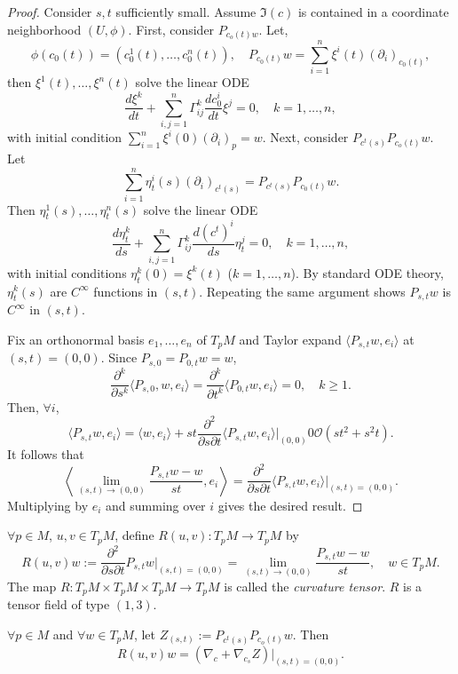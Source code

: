 \begin{proof}
Consider $s,t$ sufficiently small. Assume $\Im(c)$ is contained in a coordinate neighborhood $(U,\phi)$.
First, consider $P_{c_o(t)w}$. Let, 
\[
\phi(c_0(t)) = (c_0^1(t), \dots, c_0^n(t)),\quad P_{c_0(t)}w = \sum_{i=1}^n\xi^i(t)(\partial_i)_{c_0(t)},
\]
then $\xi^1(t), \dots, \xi^n(t)$ solve the linear ODE
\[
\frac{d\xi^k}{dt} + \sum_{i,j = 1}^{n}\Gamma_{ij}^k\frac{dc_0^i}{dt}\xi^j=0,\quad k=1,\dots,n,
\]
with initial condition $\sum_{i=1}^n \xi^i(0)(\partial_i)_p=w.$
Next, consider $P_{c^t(s)}P_{c_o(t)}w$. Let
\[
\sum_{i=1}^n \eta^i_t(s)(\partial_i)_{c^t(s)} = P_{c^t(s)}P_{c_0(t)}w.
\]
Then $\eta^1_t(s), \dots, \eta^n_t(s)$ solve the linear ODE
\[
\frac{d\eta^k_t}{ds} + \sum_{i,j = 1}^{n}\Gamma_{ij}^k\frac{d(c^t)^i}{ds}\eta^j_t=0,\quad k=1,\dots,n,
\]
with initial conditions $\eta_t^k(0) = \xi^k(t)$ ($k=1,\dots,n$).
By standard ODE theory, $\eta_t^k(s)$ are $C^{\infty}$ functions in $(s,t)$.
Repeating the same argument shows $P_{s,t}w$ is $C^{\infty}$ in $(s,t)$.

Fix an orthonormal basis $e_1, \dots, e_n$ of $T_pM$ and Taylor expand $\langle P_{s,t}w, e_i\rangle$ at $(s,t)=(0,0)$. Since 
$P_{s,0} = P_{0,t}w = w$,
\[
\frac{\partial^k}{\partial s^k}\langle P_{s,0},w,e_i\rangle = \frac{\partial^k}{\partial t^k}\langle P_{0,t}w,e_i\rangle = 0, \quad k\geq1.
\]
Then, $\forall i$,
\[
\langle P_{s,t}w,e_i\rangle = \langle w,e_i\rangle + st\frac{\partial^2}{\partial s\partial t}\langle P_{s,t}w, e_i\rangle\Bigg|_{(0,0)} 0 \mathcal{O}(st^2 + s^2t).
\]
It follows that
\[
\left\langle \lim_{(s,t)\to(0,0)}\frac{P_{s,t}w -w }{st},e_i\right\rangle = \frac{\partial^2}{\partial s\partial t}\langle P_{s,t}w,e_i\rangle\Bigg|_{(s,t)=(0,0)}.
\]
Multiplying by $e_i$ and summing over $i$ gives the desired result.
\end{proof}

\begin{definition}
$\forall p \in M$, $u,v \in T_pM$, define $R(u,v) : T_pM \to T_pM$ by
\[
R(u,v)w := \frac{\partial^2}{\partial s \partial t} P_{s,t}w\Bigg|_{(s,t)=(0,0)} = \lim_{(s,t)\to(0,0)}\frac{P_{s,t}w - w}{st}, \quad w \in T_pM.
\]
The map $R:T_pM \times T_pM \times T_pM \to T_pM$ is called the \emph{curvature tensor}.
$R$ is a tensor field of type $(1,3)$.
\end{definition}

\begin{lemma}\label{lemma:8.3}
$\forall p \in M$ and $\forall w \in T_pM$, let $Z_{(s,t)} := P_{c^t(s)}P_{c_o(t)}w$. Then
\[
R(u,v)w = (\nabla_c + \nabla_{c_s}Z)\Big|_{(s,t)=(0,0)}.
\]
\end{lemma}

